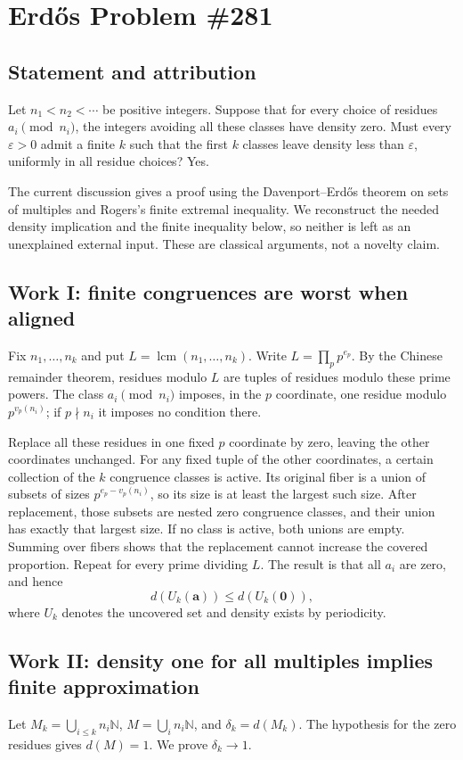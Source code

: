 \section{Erd\H{o}s Problem \#281}
\subsection{Statement and attribution}
Let $n_1<n_2<\cdots$ be positive integers. Suppose that for every choice of residues $a_i\pmod{n_i}$, the integers avoiding all these classes have density zero. Must every $\varepsilon>0$ admit a finite $k$ such that the first $k$ classes leave density less than $\varepsilon$, uniformly in all residue choices? Yes.

The current discussion gives a proof using the Davenport--Erd\H{o}s theorem on sets of multiples and Rogers's finite extremal inequality. We reconstruct the needed density implication and the finite inequality below, so neither is left as an unexplained external input. These are classical arguments, not a novelty claim.

\subsection{Work I: finite congruences are worst when aligned}
Fix $n_1,\ldots,n_k$ and put $L=\operatorname{lcm}(n_1,\ldots,n_k)$. Write $L=\prod_p p^{e_p}$. By the Chinese remainder theorem, residues modulo $L$ are tuples of residues modulo these prime powers. The class $a_i\pmod{n_i}$ imposes, in the $p$ coordinate, one residue modulo $p^{v_p(n_i)}$; if $p\nmid n_i$ it imposes no condition there.

Replace all these residues in one fixed $p$ coordinate by zero, leaving the other coordinates unchanged. For any fixed tuple of the other coordinates, a certain collection of the $k$ congruence classes is active. Its original fiber is a union of subsets of sizes $p^{e_p-v_p(n_i)}$, so its size is at least the largest such size. After replacement, those subsets are nested zero congruence classes, and their union has exactly that largest size. If no class is active, both unions are empty. Summing over fibers shows that the replacement cannot increase the covered proportion. Repeat for every prime dividing $L$. The result is that all $a_i$ are zero, and hence
\[
 d(U_k(\mathbf a))\le d(U_k(\mathbf0)),
 \tag{1}
\]
where $U_k$ denotes the uncovered set and density exists by periodicity.

\subsection{Work II: density one for all multiples implies finite approximation}
Let $M_k=\bigcup_{i\le k}n_i\mathbb N$, $M=\bigcup_i n_i\mathbb N$, and $\delta_k=d(M_k)$. The hypothesis for the zero residues gives $d(M)=1$. We prove $\delta_k\to1$.

